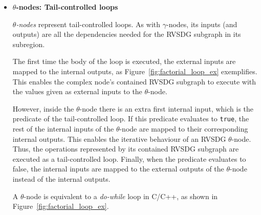 \begin{itemize}
\item \textbf{$\theta$-nodes: Tail-controlled loops}

\textit{$\theta$-nodes} represent tail-controlled loops. As with
$\gamma$-nodes, its inputs (and outputs) are all the dependencies needed for the
RVSDG subgraph in its subregion.

The first time the body of the loop is executed, the external inputs are
mapped to the internal outputs, as Figure~\ref{fig:factorial_loop_ex}
exemplifies. This enables the complex node's contained RVSDG subgraph to
execute with the values given as external inputs to the $\theta$-node.

However, inside the $\theta$-node there is an extra first internal input, which
is the predicate of the tail-controlled loop. If this predicate evaluates to
\lstinline!true!, the rest of the internal inputs of the $\theta$-node are
mapped to their corresponding internal outputs. This enables the iterative
behaviour of an RVSDG $\theta$-node. Thus, the operations represented by its
contained RVSDG subgraph are executed as a tail-controlled loop. Finally, when
the predicate evaluates to false, the internal inputs are mapped to the external
outputs of the $\theta$-node instead of the internal outputs.

A $\theta$-node is equivalent to a \textit{do-while} loop in C/C++, as shown in
Figure~\ref{fig:factorial_loop_ex}.


\end{itemize}
